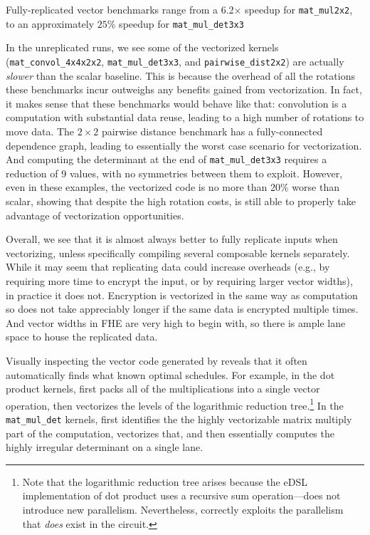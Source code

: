 Fully-replicated vector benchmarks range from a 6.2$\times$ speedup for \texttt{mat\_mul2x2}, to an approximately $25\%$ speedup for \texttt{mat\-\_mul\-\_det3x3}

In the unreplicated runs, we see some of the vectorized kernels (\texttt{mat\-\_convol\-\_4x4x2x2}, \texttt{mat\-\_mul\-\_det3x3}, and \texttt{pair\-wise\-\_dist2x2}) are actually {\em slower} than the scalar baseline.
This is because the overhead of all the rotations these benchmarks incur outweighs any benefits gained from vectorization.
In fact, it makes sense that these benchmarks would behave like that: convolution is a computation with substantial data reuse, leading to a high number of rotations to move data.
The $2 \times 2$ pairwise distance benchmark has a fully-connected dependence graph, leading to essentially the worst case scenario for vectorization.
And computing the determinant at the end of \texttt{mat\_mul\_det3x3} requires a reduction of 9 values, with no symmetries between them to exploit.
However, even in these examples, the vectorized code is no more than 20\% worse than scalar, showing that despite the high rotation costs, \system is still able to properly take advantage of vectorization opportunities.

Overall, we see that it is almost always better to fully replicate inputs when vectorizing, unless specifically compiling several composable kernels separately. While it may seem that replicating data could increase overheads (e.g., by requiring more time to encrypt the input, or by requiring larger vector widths), in practice it does not. Encryption is vectorized in the same way as computation so does not take appreciably longer if the same data is encrypted multiple times. And vector widths in FHE are very high to begin with, so there is ample lane space to house the replicated data.

Visually inspecting the vector code generated by \system reveals that it often automatically finds what known optimal schedules.
For example, in the dot product kernels, \system first packs all of the multiplications into a single vector operation, then vectorizes the levels of the logarithmic reduction tree.\footnote{Note that the logarithmic reduction tree arises because the eDSL implementation of dot product uses a recursive sum operation---\system does not introduce new parallelism. Nevertheless, \system correctly exploits the parallelism that {\em does} exist in the circuit.}
In the \texttt{mat\_mul\_det} kernels, \system first identifies the the highly vectorizable matrix multiply part of the computation, vectorizes that, and then essentially computes the highly irregular determinant on a single lane.

